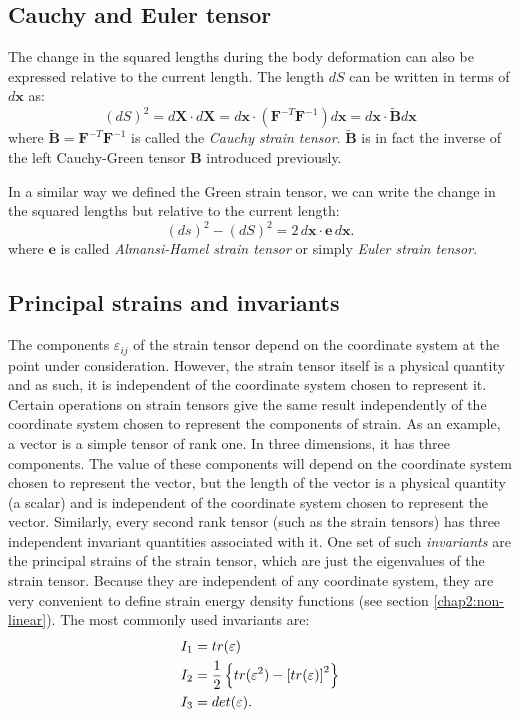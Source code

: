 	\subsection{Cauchy and Euler tensor}
The change in the squared lengths during the body deformation can also be expressed relative to the current length. The length $dS$ can be written in terms of $d\mathbf{x}$ as:
\begin{equation}
(dS)^2 = d\mathbf{X} \cdot d\mathbf{X} = d\mathbf{x} \cdot (\mathbf{F}^{-T} \mathbf{F}^{-1}) d\mathbf{x} = d\mathbf{x} \cdot \mathbf{\tilde{B}} d\mathbf{x}
\end{equation}
where $\mathbf{\tilde{B}} = \mathbf{F}^{-T} \mathbf{F}^{-1}$ is called the \emph{Cauchy strain tensor}. $\mathbf{\tilde{B}}$ is in fact the inverse of the left Cauchy-Green tensor $\mathbf{B}$ introduced previously. 

In a similar way we defined the Green strain tensor, we can write the change in the squared lengths but relative to the current length:
\begin{equation}
(ds)^2 - (dS)^2 = 2 \, d\mathbf{x} \cdot \mathbf{e} \, d\mathbf{x}.
\end{equation}
where $\mathbf{e}$ is called \emph{Almansi-Hamel strain tensor} or simply \emph{Euler strain tensor}. 

	
	\subsection{Principal strains and invariants}	\label{chap2:strainInvariants}
The components $\varepsilon_{ij}$ of the strain tensor depend on the coordinate system at the point under consideration. However, the strain tensor itself is a physical quantity and as such, it is independent of the coordinate system chosen to represent it. Certain operations on strain tensors give the same result independently of the coordinate system chosen to represent the components of strain. As an example, a vector is a simple tensor of rank one. In three dimensions, it has three components. The value of these components will depend on the coordinate system chosen to represent the vector, but the length of the vector is a physical quantity (a scalar) and is independent of the coordinate system chosen to represent the vector. Similarly, every second rank tensor (such as the strain tensors) has three independent invariant quantities associated with it. One set of such \emph{invariants} are the principal strains of the strain tensor, which are just the eigenvalues of the strain tensor. Because they are independent of any coordinate system, they are very convenient to define strain energy density functions (see section \ref{chap2:non-linear}). The most commonly used invariants are:
\begin{align}
I_1 &= tr(\varepsilon) \notag \\
I_2 &= \frac{1}{2} \left\lbrace tr(\varepsilon^{2}) - \left[tr(\varepsilon)\right]^{2} \right\rbrace \\
I_3 &= det(\varepsilon). \notag
\end{align}

